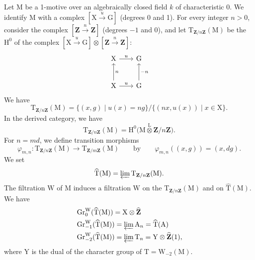 \documentclass[11pt,leqno]{article}
\newcommand{\Page}[1]{\ifvmode\noindent\else\unskip\ \fi{\footnotesize\textcolor{gray}{[p.\,#1]}}\ \ignorespaces}
\begin{document}
Let \(\mathrm{M}\) be a 1-motive over an algebraically closed field \(k\)
of characteristic 0. We identify \(\mathrm{M}\) with a complex
\([\mathrm{X}\xrightarrow{u}\mathrm{G}]\) (degrees 0 and 1).
For every integer \(n>0\), consider the complex
\([\mathbf{Z}\xrightarrow{n}\mathbf{Z}]\) (degrees \(-1\) and 0),
and let \(\mathrm{T}_{\mathbf{Z}/n\mathbf{Z}}(\mathrm{M})\) be the
\(\mathrm{H}^0\) of the complex
\([\mathrm{X}\xrightarrow{u}\mathrm{G}]
\otimes[\mathbf{Z}\xrightarrow{n}\mathbf{Z}]\):
\Page{57}
\[
\begin{tikzcd}[column sep=2em, row sep=2.5em]
\mathrm{X} \arrow[r, "u"] & \mathrm{G}
\\
\mathrm{X} \arrow[r, "u"] \arrow[u, "n"']
& \mathrm{G} \arrow[u, "-n"']
\end{tikzcd}
\]
We have
\[
\mathrm{T}_{\mathbf{Z}/n\mathbf{Z}}(\mathrm{M})
=\{(x,g)\mid u(x)=ng\}/\{(nx,u(x))\mid x\in\mathrm{X}\}.
\]
In the derived category, we have
\[
\mathrm{T}_{\mathbf{Z}/n\mathbf{Z}}(\mathrm{M})
=\mathrm{H}^0
\bigl(\mathrm{M}\overset{\mathrm{L}}{\otimes}\mathbf{Z}/n\mathbf{Z}\bigr).
\]
For \(n=md\), we define transition morphisms
\[
\varphi_{m,n}:
\mathrm{T}_{\mathbf{Z}/n\mathbf{Z}}(\mathrm{M})
\to\mathrm{T}_{\mathbf{Z}/m\mathbf{Z}}(\mathrm{M})
\qquad\text{by}\qquad
\varphi_{m,n}((x,g))=(x,dg).
\]
We set
\[
\widehat{\mathrm{T}}(\mathrm{M})
=\varprojlim\mathrm{T}_{\mathbf{Z}/n\mathbf{Z}}(\mathrm{M}).
\]
The filtration \(\mathrm{W}\) of \(\mathrm{M}\) induces a filtration
\(\mathrm{W}\) on the
\(\mathrm{T}_{\mathbf{Z}/n\mathbf{Z}}(\mathrm{M})\) and on
\(\widehat{\mathrm{T}}(\mathrm{M})\). We have
\[
\begin{aligned}
&\operatorname{Gr}^{\mathrm{W}}_0(\widehat{\mathrm{T}}(\mathrm{M}))
  =\mathrm{X}\otimes\widehat{\mathbf{Z}}
\\
&\operatorname{Gr}^{\mathrm{W}}_{-1}(\widehat{\mathrm{T}}(\mathrm{M}))
  =\varprojlim\mathrm{A}_n=\widehat{\mathrm{T}}(\mathrm{A})
\\
&\operatorname{Gr}^{\mathrm{W}}_{-2}(\widehat{\mathrm{T}}(\mathrm{M}))
  =\varprojlim\mathrm{T}_n=\mathrm{Y}\otimes\widehat{\mathbf{Z}}(1),
\end{aligned}
\]
where \(\mathrm{Y}\) is the dual of the character group of
\(\mathrm{T}=\mathrm{W}_{-2}(\mathrm{M})\).
\end{document}
